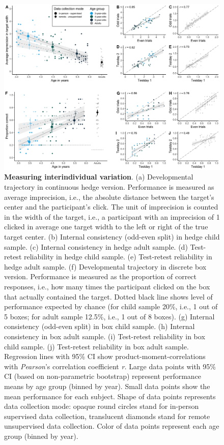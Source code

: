 \documentclass[
  man,floatsintext]{apa6}
\begin{document}
\begin{figure}

{\centering \includegraphics[width=1\linewidth]{../figures/gafo_results} 

}

\caption{\textbf{Measuring interindividual variation}.
(a) Developmental trajectory in continuous hedge version. Performance is measured as average imprecision, i.e., the absolute distance between the target's center and the participant's click. The unit of imprecision is counted in the width of the target, i.e., a participant with an imprecision of 1 clicked in average one target width to the left or right of the true target center.
(b) Internal consistency (odd-even split) in hedge child sample. (c) Internal consistency in hedge adult sample. (d) Test-retest reliability in hedge child sample. (e) Test-retest reliability in hedge adult sample.
(f) Developmental trajectory in discrete box version. Performance is measured as the proportion of correct responses, i.e., how many times the participant clicked on the box that actually contained the target. Dotted black line shows level of performance expected by chance (for child sample 20\%, i.e., 1 out of 5 boxes; for adult sample 12.5\%, i.e., 1 out of 8 boxes).
(g) Internal consistency (odd-even split) in box child sample. (h) Internal consistency in box adult sample. (i) Test-retest reliability in box child sample. (j) Test-retest reliability in box adult sample.
Regression lines with 95\% CI show product-moment-correlations with \emph{Pearson}'s correlation coefficient \emph{r.}
Large data points with 95\% CI (based on non-parametric bootstrap) represent performance means by age group (binned by year).
Small data points show the mean performance for each subject. Shape of data points represents data collection mode: opaque round circles stand for in-person supervised data collection, translucent diamonds stand for remote unsupervised data collection. Color of data points represent each age group (binned by year).}\label{fig:fig2}
\end{figure}
\end{document}
